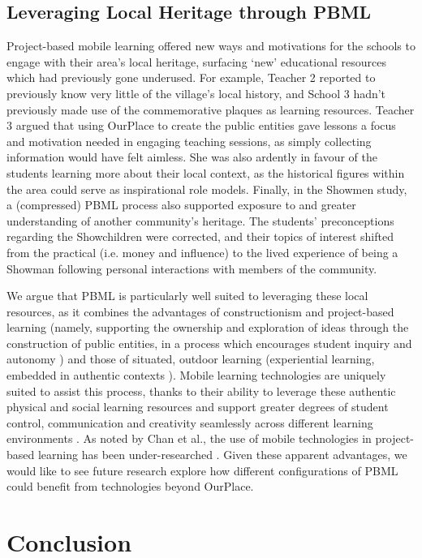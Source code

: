 \documentclass[,hyphens]{sigchi}
\begin{document}
\subsection{Leveraging Local Heritage through PBML}
Project-based mobile learning offered new ways and motivations for the schools to engage with their area's local heritage, surfacing `new' educational resources which had previously gone underused. For example, Teacher 2 reported to previously know very little of the village's local history, and School 3 hadn't previously made use of the commemorative plaques as learning resources. Teacher 3 argued that using OurPlace to create the public entities gave lessons a focus and motivation needed in engaging teaching sessions, as simply collecting information would have felt aimless. She was also ardently in favour of the students learning more about their local context, as the historical figures within the area could serve as inspirational role models. Finally, in the Showmen study, a (compressed) PBML process also supported exposure to and greater understanding of another community's heritage. The students' preconceptions regarding the Showchildren were corrected, and their topics of interest shifted from the practical (i.e. money and influence) to the lived experience of being a Showman following personal interactions with members of the community.

We argue that PBML is particularly well suited to leveraging these local resources, as it combines the advantages of constructionism and project-based learning (namely, supporting the ownership and exploration of ideas through the construction of public entities, in a process which encourages student inquiry and autonomy \cite{Noss2017, Larmer2015}) and those of situated, outdoor learning (experiential learning, embedded in authentic contexts \cite{Lave1991}). Mobile learning technologies are uniquely suited to assist this process, thanks to their ability to leverage these authentic physical and social learning resources and support greater degrees of student control, communication and creativity seamlessly across different learning environments \cite{Sharples2007, Richardson2018}. As noted by Chan et al., the use of mobile technologies in project-based learning has been under-researched \cite{Chan2015}. Given these apparent advantages, we would like to see future research explore how different configurations of PBML could benefit from technologies beyond OurPlace.

\section{Conclusion}
\end{document}
